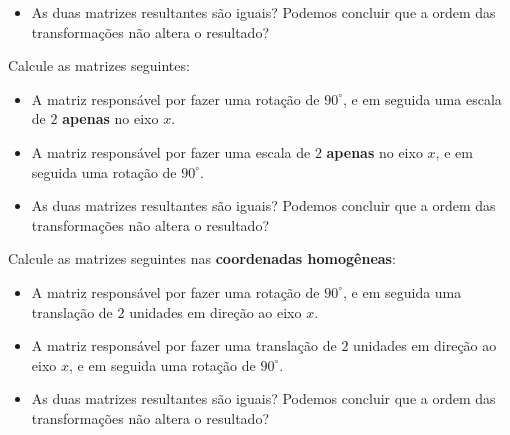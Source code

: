 \documentclass[12pt]{exam}
\begin{document}
\begin{questions}
\begin{itemize}
\item As duas matrizes resultantes são iguais? Podemos concluir que a ordem das transformações não altera o resultado?

\end{itemize}

\question Calcule as matrizes seguintes:

\begin{itemize}

\item A matriz responsável por fazer uma rotação de $90^\circ$, e em seguida uma escala de $2$ \textbf{apenas} no eixo $x$.

\item A matriz responsável por fazer uma escala de $2$ \textbf{apenas} no eixo $x$, e em seguida uma rotação de $90^\circ$.

\item As duas matrizes resultantes são iguais? Podemos concluir que a ordem das transformações não altera o resultado?

\end{itemize}

\question Calcule as matrizes seguintes nas \textbf{coordenadas homogêneas}:

\begin{itemize}

\item A matriz responsável por fazer uma rotação de $90^\circ$, e em seguida uma translação de $2$ unidades em direção ao eixo $x$.

\item A matriz responsável por fazer uma translação de $2$ unidades em direção ao eixo $x$, e em seguida uma rotação de $90^\circ$.

\item As duas matrizes resultantes são iguais? Podemos concluir que a ordem das transformações não altera o resultado?

\end{itemize}


\end{questions}
\end{document}
